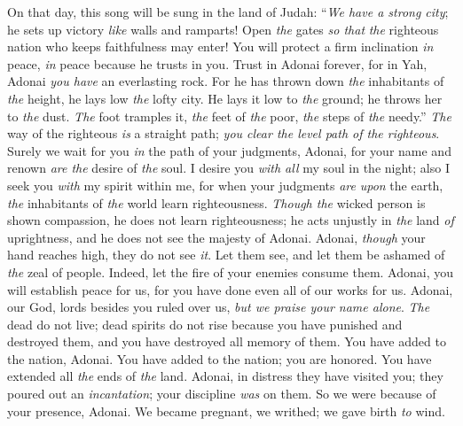 \begin{biblechapter} %
 On that day, this song will be sung in the land of Judah: “\textit{We have a strong city}; 
he sets up victory \textit{like} walls and ramparts!
\verse Open \textit{the} gates \textit{so that} \textit{the} righteous nation who keeps faithfulness may enter!
\verse You will protect a firm inclination \textit{in} peace, 
\textit{in} peace because he trusts in you.
\verse Trust in Adonai forever, 
for in Yah, Adonai \textit{you have} an everlasting rock.
\verse For he has thrown down \textit{the} inhabitants of \textit{the} height, 
he lays low \textit{the} lofty city. 
He lays it low to \textit{the} ground; 
he throws her to \textit{the} dust.
\verse \textit{The} foot tramples it, 
\textit{the} feet of \textit{the} poor, \textit{the} steps of \textit{the} needy.”
 \textit{The} way of the righteous \textit{is} a straight path; 
\textit{you clear the level path of the righteous}.
\verse Surely we wait for you \textit{in} the path of your judgments, Adonai, 
for your name and renown \textit{are the} desire of \textit{the} soul.
\verse I desire you \textit{with all} my soul in the night; 
also I seek you \textit{with} my spirit within me, 
for when your judgments \textit{are} \textit{upon} the earth, 
\textit{the} inhabitants of \textit{the} world learn righteousness.
\verse \textit{Though the} wicked person is shown compassion, he does not learn righteousness; he acts unjustly in \textit{the} land \textit{of} uprightness, 
and he does not see the majesty of Adonai.
\verse Adonai, \textit{though} your hand reaches high, they do not see \textit{it}.
\verse Let them see, and let them be ashamed of \textit{the} zeal of people. 
Indeed, let the fire of your enemies consume them.
\verse Adonai, you will establish peace for us, 
for you have done even all of our works for us.
\verse Adonai, our God, lords besides you ruled over us, 
\textit{but we praise your name alone}.
\verse \textit{The} dead do not live; 
dead spirits do not rise 
because you have punished and destroyed them, 
and you have destroyed all memory of them.
\verse You have added to the nation, Adonai. 
You have added to the nation; you are honored. 
You have extended all \textit{the} ends of \textit{the} land.
\verse Adonai, in distress they have visited you; 
they poured out an \textit{incantation}; 
your discipline \textit{was} on them. So we were because of your presence, Adonai.
\verse We became pregnant, we writhed; 
we gave birth \textit{to} wind. 

\end{biblechapter}
